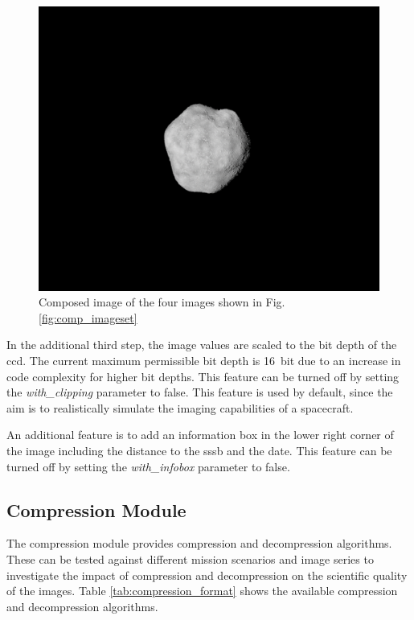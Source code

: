 \begin{figure}[htb]
    \centering
    \includegraphics[width=\textwidth]{doc/thesis/0_figures/composition/Comp_2017-08-15T115854-575000.png}
    \caption{Composed image of the four images shown in Fig. \ref{fig:comp_imageset}}
    \label{fig:comp_composed}
\end{figure}

In the additional third step, the image values are scaled to the bit depth of the \gls{ccd}. The current maximum permissible bit depth is \SI{16}{bit} due to an increase in code complexity for higher bit depths. This feature can be turned off by setting the \textit{with\_clipping} parameter to false. This feature is used by default, since the aim is to realistically simulate the imaging capabilities of a spacecraft.

An additional feature is to add an information box in the lower right corner of the image including the distance to the \gls{sssb} and the date. This feature can be turned off by setting the \textit{with\_infobox} parameter to false.

\subsection{Compression Module}
The compression module provides compression and decompression algorithms. These can be tested against different mission scenarios and image series to investigate the impact of compression and decompression on the scientific quality of the images. Table \ref{tab:compression_format} shows the available compression and decompression algorithms.

